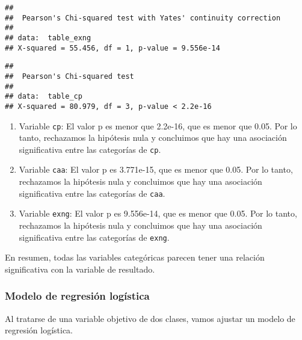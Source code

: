 \documentclass[
]{article}
\newenvironment{Shaded}{\begin{snugshade}}{\end{snugshade}}
\newcommand{\CommentTok}[1]{\textcolor[rgb]{0.56,0.35,0.01}{\textit{#1}}}
\newcommand{\FunctionTok}[1]{\textcolor[rgb]{0.00,0.00,0.00}{#1}}
\newcommand{\NormalTok}[1]{#1}
\newcommand{\OtherTok}[1]{\textcolor[rgb]{0.56,0.35,0.01}{#1}}
\newcommand{\SpecialCharTok}[1]{\textcolor[rgb]{0.00,0.00,0.00}{#1}}
\begin{document}
\begin{verbatim}
## 
##  Pearson's Chi-squared test with Yates' continuity correction
## 
## data:  table_exng
## X-squared = 55.456, df = 1, p-value = 9.556e-14
\end{verbatim}

\begin{Shaded}
\end{Shaded}

\begin{verbatim}
## 
##  Pearson's Chi-squared test
## 
## data:  table_cp
## X-squared = 80.979, df = 3, p-value < 2.2e-16
\end{verbatim}

\begin{enumerate}
\def\labelenumi{\arabic{enumi}.}
\item
  Variable \texttt{cp}: El valor p es menor que 2.2e-16, que es menor
  que 0.05. Por lo tanto, rechazamos la hipótesis nula y concluimos que
  hay una asociación significativa entre las categorías de \texttt{cp}.
\item
  Variable \texttt{caa}: El valor p es 3.771e-15, que es menor que 0.05.
  Por lo tanto, rechazamos la hipótesis nula y concluimos que hay una
  asociación significativa entre las categorías de \texttt{caa}.
\item
  Variable \texttt{exng}: El valor p es 9.556e-14, que es menor que
  0.05. Por lo tanto, rechazamos la hipótesis nula y concluimos que hay
  una asociación significativa entre las categorías de \texttt{exng}.
\end{enumerate}

En resumen, todas las variables categóricas parecen tener una relación
significativa con la variable de resultado.

\hypertarget{modelo-de-regresiuxf3n-loguxedstica}{%
\subsubsection{Modelo de regresión
logística}\label{modelo-de-regresiuxf3n-loguxedstica}}

Al tratarse de una variable objetivo de dos clases, vamos ajustar un
modelo de regresión logística.
\end{document}
